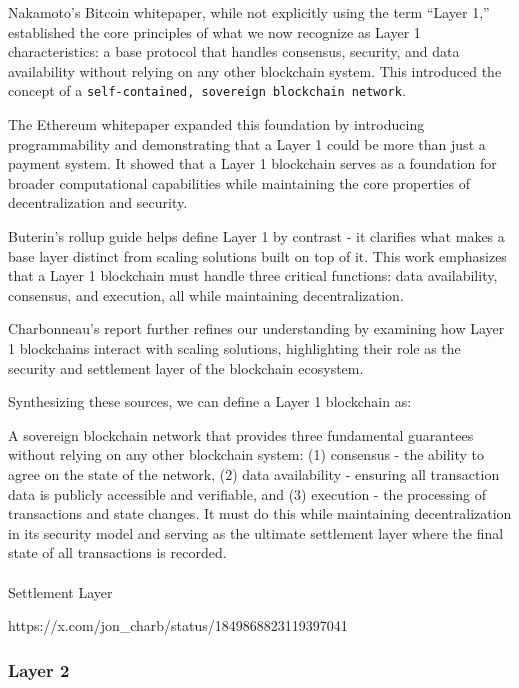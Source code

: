 \documentclass[
  letterpaper,
  DIV=11,
  numbers=noendperiod]{scrreprt}
\makeatletter
\let\oldparagraph\paragraph
\renewcommand{\paragraph}{
    \@ifstar
      \xxxParagraphStar
      \xxxParagraphNoStar
  }
\newcommand{\xxxParagraphStar}[1]{\oldparagraph*{#1}\mbox{}}
\newcommand{\xxxParagraphNoStar}[1]{\oldparagraph{#1}\mbox{}}
\makeatother
\begin{document}
Nakamoto's Bitcoin whitepaper, while not explicitly using the term
``Layer 1,'' established the core principles of what we now recognize as
Layer 1 characteristics: a base protocol that handles consensus,
security, and data availability without relying on any other blockchain
system. This introduced the concept of a
\texttt{self-contained,\ sovereign\ blockchain\ network}.

The Ethereum whitepaper expanded this foundation by introducing
programmability and demonstrating that a Layer 1 could be more than just
a payment system. It showed that a Layer 1 blockchain serves as a
foundation for broader computational capabilities while maintaining the
core properties of decentralization and security.

Buterin's rollup guide helps define Layer 1 by contrast - it clarifies
what makes a base layer distinct from scaling solutions built on top of
it. This work emphasizes that a Layer 1 blockchain must handle three
critical functions: data availability, consensus, and execution, all
while maintaining decentralization.

Charbonneau's report further refines our understanding by examining how
Layer 1 blockchains interact with scaling solutions, highlighting their
role as the security and settlement layer of the blockchain ecosystem.

Synthesizing these sources, we can define a Layer 1 blockchain as:

A sovereign blockchain network that provides three fundamental
guarantees without relying on any other blockchain system: (1) consensus
- the ability to agree on the state of the network, (2) data
availability - ensuring all transaction data is publicly accessible and
verifiable, and (3) execution - the processing of transactions and state
changes. It must do this while maintaining decentralization in its
security model and serving as the ultimate settlement layer where the
final state of all transactions is recorded.

\paragraph{Settlement Layer}\label{settlement-layer}

https://x.com/jon\_charb/status/1849868823119397041

\subsubsection{Layer 2}\label{layer-2}
\end{document}
